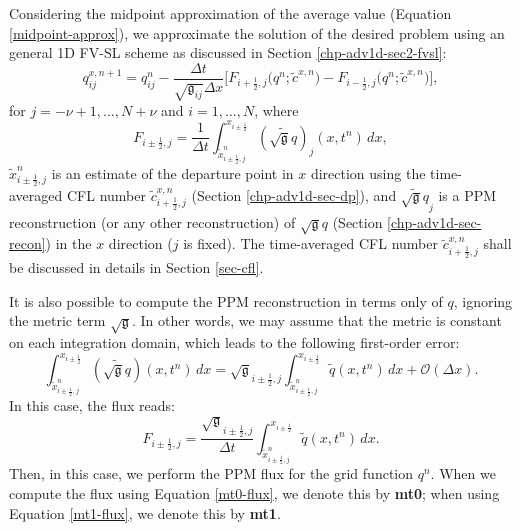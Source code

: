 Considering the midpoint approximation of the average value (Equation \eqref{midpoint-approx}), we approximate
the solution of the desired problem using an general 1D FV-SL scheme as discussed in Section \ref{chp-adv1d-sec2-fvsl}:
\begin{equation}
	\label{1d-qx}
	q^{x,n+1}_{ij} = q^{n}_{ij}  - \frac{\Delta t}{\sqrt{\mathfrak{g}_{ij}}\Delta x}
	\bigg[{F}_{i+\frac{1}{2},j}
	\big({q}^{n}; \tilde{c}^{x,n}\big) - 
	{F}_{i-\frac{1}{2},j}
	\big({q}^{n}; \tilde{c}^{x,n}\big)\bigg],
\end{equation}
for  $j=-\nu+1, \ldots, N+\nu$ and $i=1, \ldots, N$, where
\begin{equation}
	\label{mt0-flux}
	{F}_{i\pm\frac{1}{2},j} = \frac{1}{\Delta t}\int_{ \tilde{x}_{i\pm\frac{1}{2},j}^n}^{x_{i\pm\frac{1}{2}}}(\widetilde{\sqrt{\mathfrak{g}}{q}})_j(x, t^n) \,dx,
\end{equation}
$\tilde{x}_{i\pm\frac{1}{2},j}^n$ is an estimate of the departure point in $x$ direction using the time-averaged
CFL number $\tilde{c}^{x,n}_{i+\frac{1}{2},j}$ (Section \ref{chp-adv1d-sec-dp}),
and $\widetilde{\sqrt{\mathfrak{g}}{q}}_j$ is a PPM reconstruction (or any other reconstruction) of $\sqrt{\mathfrak{g}}{q}$ (Section \ref{chp-adv1d-sec-recon})
in the $x$ direction ($j$ is fixed).
The time-averaged CFL number $\tilde{c}^{x,n}_{i+\frac{1}{2},j}$ shall be discussed in details in Section \ref{sec-cfl}.

It is also possible to compute the PPM reconstruction in terms only of $q$, ignoring the metric term $\sqrt{\mathfrak{g}}$.
In other words, we may assume that the metric is constant on each integration domain, which leads to the following first-order error:
\begin{equation}
\int_{ \tilde{x}_{i\pm\frac{1}{2},j}^n}^{x_{i\pm\frac{1}{2}}}(\widetilde{\sqrt{\mathfrak{g}}{q}})(x, t^n) \,dx
= \sqrt{\mathfrak{g}}_{i\pm\frac{1}{2},j}\int_{  \tilde{x}_{i\pm\frac{1}{2},j}^n}^{x_{i\pm\frac{1}{2}}}\widetilde{q}(x, t^n) \,dx + \mathcal{O}(\Delta x).
\end{equation}
In this case, the flux reads:
\begin{equation}
	\label{mt1-flux}
	{F}_{i\pm\frac{1}{2},j} =  \frac{\sqrt{\mathfrak{g}}_{i\pm\frac{1}{2},j}}{\Delta t}\int_{  \tilde{x}_{i\pm\frac{1}{2},j}^n}^{x_{i\pm\frac{1}{2}}}\widetilde{q}(x, t^n)  \,dx.
\end{equation}
Then, in this case, we perform the PPM flux for the grid function $q^n$.
When we compute the flux using Equation \eqref{mt0-flux}, we denote this by \textbf{mt0};
when using Equation \eqref{mt1-flux}, we denote this by \textbf{mt1}.

